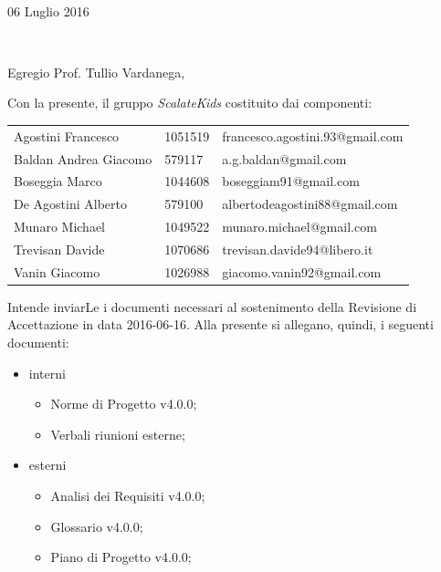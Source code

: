 \documentclass[10pt,a4paper]{letter} %
\makeatletter
\def\opening#1{\thispagestyle{empty}
  {\centering\fromaddress \vspace{0.6in} \\ %
    \hspace*{\longindentation}06 Luglio 2016\hspace*{\fill}\par} %
  {\raggedright \toname \\ \toaddress \par} %
  \vspace{0.4in} %
  \noindent #1 %
  \def\thefootnote{}
  \def\footnoterule{\hrule}
  \footnotetext{\hspace*{\fill}{\footnotesize\em ScalateKids - scalatekids@gmail.com}}
  \def\thefootnote{\arabic{footnote}}
}
\makeatother
\begin{document}

\begin{letter}{}


  \opening{Egregio Prof. Tullio Vardanega,\\}

  Con la presente, il gruppo \textit{ScalateKids} costituito dai componenti:
  \begin{center}
    \begin{tabular}[H]{l l l}
      Agostini Francesco & 1051519 & francesco.agostini.93@gmail.com \\
      Baldan Andrea Giacomo & 579117 & a.g.baldan@gmail.com \\
      Boseggia Marco & 1044608 & boseggiam91@gmail.com \\
      De Agostini Alberto & 579100 & albertodeagostini88@gmail.com \\
      Munaro Michael & 1049522 & munaro.michael@gmail.com \\
      Trevisan Davide & 1070686 & trevisan.davide94@libero.it \\
      Vanin Giacomo & 1026988 & giacomo.vanin92@gmail.com \\
    \end{tabular}
  \end{center}
  Intende inviarLe i documenti necessari al sostenimento della Revisione di Accettazione in data 2016-06-16.
  Alla presente si allegano, quindi, i seguenti documenti:
  \begin{itemize}
  \item interni
    \begin{itemize}
    \item Norme di Progetto v4.0.0;
    \item Verbali riunioni esterne;
    \end{itemize}
  \item esterni
    \begin{itemize}
    \item Analisi dei Requisiti v4.0.0;
    \item Glossario v4.0.0;
    \item Piano di Progetto v4.0.0;

\end{itemize}
\end{itemize}
\end{letter}
\end{document}
